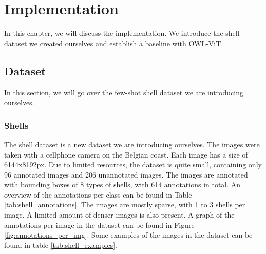  
\chapter{Implementation}
In this chapter, we will discuss the implementation. We introduce the shell dataset we created ourselves and establish a baseline with OWL-ViT. 

\section{Dataset}
In this section, we will go over the few-shot shell dataset we are introducing ourselves.

\subsection{Shells}

The shell dataset is a new dataset we are introducing ourselves. The images were taken with a cellphone camera on the Belgian coast. Each image has a size of 6144x8192px. Due to limited resources, the dataset is quite small, containing only 96 annotated images and 206 unannotated images. The images are annotated with bounding boxes of 8 types of shells, with 614 annotations in total. An overview of the annotations per class can be found in Table \ref{tab:shell_annotations}. The images are mostly sparse, with 1 to 3 shells per image. A limited amount of denser images is also present. A graph of the annotations per image in the dataset can be found in Figure \ref{fig:annotations_per_img}. Some examples of the images in the dataset can be found in table \ref{tab:shell_examples}.


